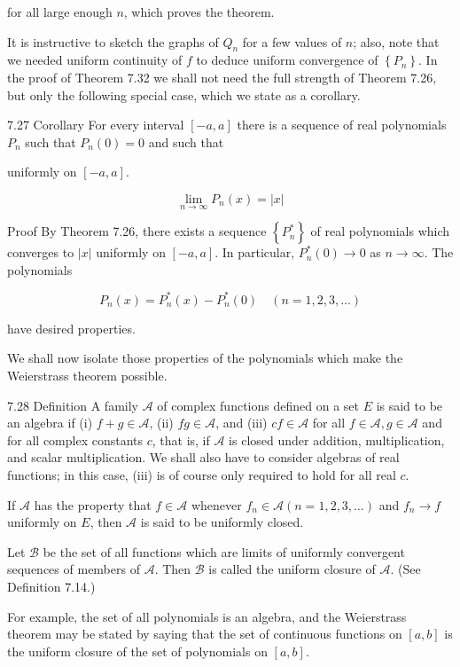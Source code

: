 \documentclass[10pt]{article}
\begin{document}
for all large enough $n$, which proves the theorem.

It is instructive to sketch the graphs of $Q_{n}$ for a few values of $n$; also, note that we needed uniform continuity of $f$ to deduce uniform convergence of $\left\{P_{n}\right\}$. In the proof of Theorem 7.32 we shall not need the full strength of Theorem 7.26, but only the following special case, which we state as a corollary.

7.27 Corollary For every interval $[-a, a]$ there is a sequence of real polynomials $P_{n}$ such that $P_{n}(0)=0$ and such that

uniformly on $[-a, a]$.

$$
\lim _{n \rightarrow \infty} P_{n}(x)=|x|
$$

Proof By Theorem 7.26, there exists a sequence $\left\{P_{n}^{*}\right\}$ of real polynomials which converges to $|x|$ uniformly on $[-a, a]$. In particular, $P_{n}^{*}(0) \rightarrow 0$ as $n \rightarrow \infty$. The polynomials

$$
P_{n}(x)=P_{n}^{*}(x)-P_{n}^{*}(0) \quad(n=1,2,3, \ldots)
$$

have desired properties.

We shall now isolate those properties of the polynomials which make the Weierstrass theorem possible.

7.28 Definition A family $\mathscr{A}$ of complex functions defined on a set $E$ is said to be an algebra if (i) $f+g \in \mathscr{A}$, (ii) $f g \in \mathscr{A}$, and (iii) $c f \in \mathscr{A}$ for all $f \in \mathscr{A}, g \in \mathscr{A}$ and for all complex constants $c$, that is, if $\mathscr{A}$ is closed under addition, multiplication, and scalar multiplication. We shall also have to consider algebras of real functions; in this case, (iii) is of course only required to hold for all real $c$.

If $\mathscr{A}$ has the property that $f \in \mathscr{A}$ whenever $f_{n} \in \mathscr{A}(n=1,2,3, \ldots)$ and $f_{n} \rightarrow f$ uniformly on $E$, then $\mathscr{A}$ is said to be uniformly closed.

Let $\mathscr{B}$ be the set of all functions which are limits of uniformly convergent sequences of members of $\mathscr{A}$. Then $\mathscr{B}$ is called the uniform closure of $\mathscr{A}$. (See Definition 7.14.)

For example, the set of all polynomials is an algebra, and the Weierstrass theorem may be stated by saying that the set of continuous functions on $[a, b]$ is the uniform closure of the set of polynomials on $[a, b]$.
\end{document}

